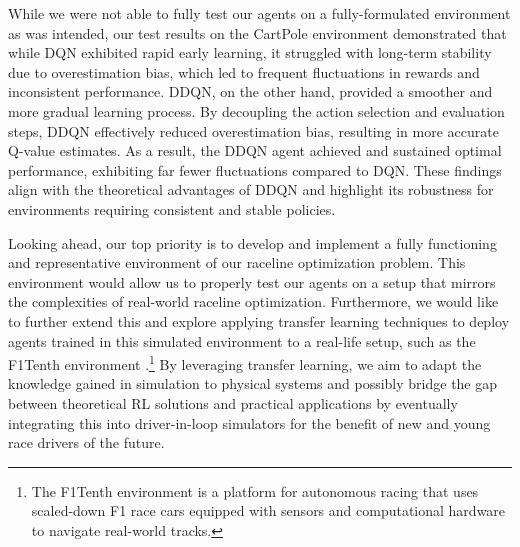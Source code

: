 \documentclass{article}
\begin{document}
While we were not able to fully test our agents on a fully-formulated environment as was intended, our test results on the CartPole environment demonstrated that while DQN exhibited rapid early learning, it struggled with long-term stability due to overestimation bias, which led to frequent fluctuations in rewards and inconsistent performance. DDQN, on the other hand, provided a smoother and more gradual learning process. By decoupling the action selection and evaluation steps, DDQN effectively reduced overestimation bias, resulting in more accurate Q-value estimates. As a result, the DDQN agent achieved and sustained optimal performance, exhibiting far fewer fluctuations compared to DQN. These findings align with the theoretical advantages of DDQN and highlight its robustness for environments requiring consistent and stable policies.



Looking ahead, our top priority is to develop and implement a fully functioning and representative environment of our raceline optimization problem. This environment would allow us to properly test our agents on a setup that mirrors the complexities of real-world raceline optimization. Furthermore, we would like to further extend this and explore applying transfer learning techniques to deploy agents trained in this simulated environment to a real-life setup, such as the F1Tenth environment \cite{okelly2020f1tenth}.\footnote{The F1Tenth environment is a platform for autonomous racing that uses scaled-down F1 race cars equipped with sensors and computational hardware to navigate real-world tracks.} 
By leveraging transfer learning, we aim to adapt the knowledge gained in simulation to physical systems and possibly bridge the gap between theoretical RL solutions and practical applications by eventually integrating this into driver-in-loop simulators for the benefit of new and young race drivers of the future.
\newpage
\end{document}
